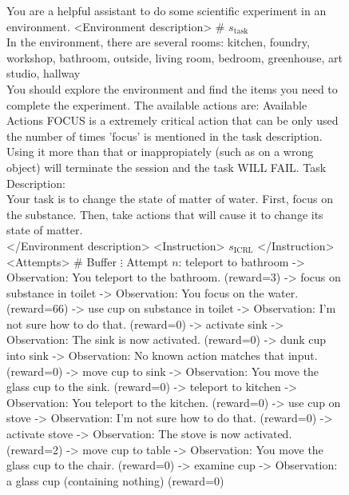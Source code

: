 \documentclass{article}
\newcommand{\0}{\mathbf{0}}
\begin{document}
\begin{figure}[H]
  \centering
  \begin{tcolorbox}[
      colback=gray!5!white,
      colframe=black!100!black,
      width=1\textwidth
  ]
  \small
You are a helpful assistant to do some scientific experiment in an environment.
<Environment description> \# {\color{red}$s_\text{task}$} \\
In the environment, there are several rooms: kitchen, foundry, workshop, bathroom, outside, living room, bedroom, greenhouse, art studio, hallway  \\
You should explore the environment and find the items you need to complete the experiment.
\vspace{.25cm}
The available actions are:
{Available Actions}
\vspace{.25cm}
FOCUS is a extremely critical action that can be only used the number of times 'focus' is mentioned in the task description. Using it more than that or inappropiately (such as on a wrong object) will terminate the session and the task WILL FAIL.
\vspace{.25cm}
Task Description: \\
Your task is to change the state of matter of water. First, focus on the substance. Then, take actions that will cause it to change its state of matter. \\
</Environment description>
\vspace{.25cm}
<Instruction>
{\color{red}$s_\text{ICRL}$}
</Instruction>
\vspace{.25cm}
<Attempts> \# {\color{red}Buffer}
\vspace{.25cm}
$\vdots$
\vspace{.25cm}
Attempt $n$:
teleport to bathroom -> Observation: You teleport to the bathroom. (reward=3)
-> focus on substance in toilet -> Observation: You focus on the water. (reward=66)
-> use cup on substance in toilet -> Observation: I'm not sure how to do that. (reward=0)
-> activate sink -> Observation: The sink is now activated. (reward=0)
-> dunk cup into sink -> Observation: No known action matches that input. (reward=0)
-> move cup to sink -> Observation: You move the glass cup to the sink. (reward=0)
-> teleport to kitchen -> Observation: You teleport to the kitchen. (reward=0)
-> use cup on stove -> Observation: I'm not sure how to do that. (reward=0)
-> activate stove -> Observation: The stove is now activated. (reward=2)
-> move cup to table -> Observation: You move the glass cup to the chair. (reward=0)
-> examine cup -> Observation: a glass cup (containing nothing) (reward=0)

\end{tcolorbox}
\end{figure}
\end{document}
